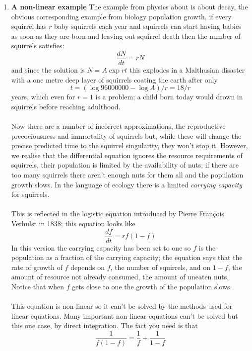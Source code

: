 \documentclass[11pt,a4paper]{scrartcl}
\begin{document}
\begin{enumerate}
        \item \textbf{A non-linear example} The example from physics
          about is about decay, the obvious corresponding example from
          biology population growth, if every squirrel has $r$ baby
          squirrels each year and squirrels can start having babies as
          soon as they are born and leaving out squirrel death then
          the number of squirrels satisfies:
          \begin{equation}
            \frac{dN}{dt}=rN
          \end{equation}
          and since the solution is $N=A\exp{rt}$ this explodes in a
          Malthusian disaster with a one metre deep layer of squirrels coating the earth after only
          \begin{equation}
            t=(\log{96000000}-\log{A})/r=18/r
          \end{equation}
          years, which even for $r=1$ is a problem; a child born today
          would drown in squirrels before reaching adulthood.\\ \\ Now
          there are a number of incorrect approximations, the
          reproductive precociousness and immortality of squirrels
          but, while these will change the precise predicted time to
          the squirrel singularity, they won't stop it. However, we
          realise that the differential equation ignores the resource
          requirements of squirrels, their population is limited by
          the availability of nuts; if there are too many squirrels
          there aren't enough nuts for them all and the population
          growth slows. In the language of ecology there is a limited
          \textsl{carrying capacity} for squirrels.\\
          \\
          This is reflected in the logistic equation introduced by Pierre Fran\c{c}ois Verhulst in 1838; this equation looks like
          \begin{equation}
            \frac{df}{dt}=rf(1-f)
          \end{equation}
In this version the carrying capacity has been set to one so $f$ is
the population as a fraction of the carrying capacity; the equation
says that the rate of growth of $f$ depends on $f$, the number of
squirrels, and on $1-f$, the amount of resource not already consumed,
the amount of uneaten nuts. Notice that when $f$ gets close to one the
growth of the population slows.\\
\\
This equation is non-linear so it can't be solved by the methods used for linear equations. Many important non-linear equations can't be solved but this one case, by direct integration. The fact you need is that
\begin{equation}
  \frac{1}{f(1-f)}=\frac{1}{f}+\frac{1}{1-f}
\end{equation}




          
        
\end{enumerate}
\end{document}
